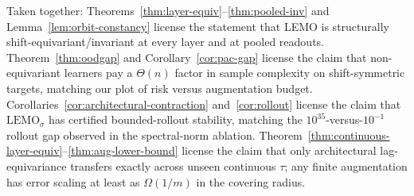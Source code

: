 \begin{remark}\label{rem:license}
Taken together:
Theorems~\ref{thm:layer-equiv}--\ref{thm:pooled-inv} and
Lemma~\ref{lem:orbit-constancy} license the statement that LEMO is
structurally shift-equivariant/invariant at every layer and at pooled
readouts.
Theorem~\ref{thm:oodgap} and Corollary~\ref{cor:pac-gap} license the
claim that non-equivariant learners pay a $\Theta(n)$ factor in
sample complexity on shift-symmetric targets, matching our
plot of risk versus augmentation budget.
Corollaries~\ref{cor:architectural-contraction} and~\ref{cor:rollout}
license the claim that $\mathrm{LEMO}_\sigma$ has certified bounded-rollout
stability, matching the $10^{35}$-versus-$10^{-1}$ rollout gap
observed in the spectral-norm ablation.
Theorem~\ref{thm:continuous-layer-equiv}--\ref{thm:aug-lower-bound}
license the claim that only architectural lag-equivariance transfers
exactly across unseen continuous $\tau$; any finite augmentation has
error scaling at least as $\Omega(1/m)$ in the covering radius.
\end{remark}
